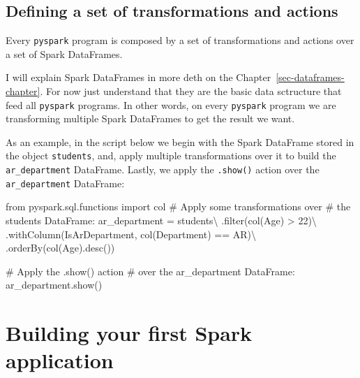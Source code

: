 \documentclass[
  11pt,
  letterpaper,
  DIV=11,
  numbers=noendperiod]{scrreprt}
\newenvironment{Shaded}{\begin{snugshade}}{\end{snugshade}}
\newcommand{\BuiltInTok}[1]{\textcolor[rgb]{0.00,0.23,0.31}{#1}}
\newcommand{\CommentTok}[1]{\textcolor[rgb]{0.37,0.37,0.37}{#1}}
\newcommand{\DecValTok}[1]{\textcolor[rgb]{0.68,0.00,0.00}{#1}}
\newcommand{\ImportTok}[1]{\textcolor[rgb]{0.00,0.46,0.62}{#1}}
\newcommand{\NormalTok}[1]{\textcolor[rgb]{0.00,0.23,0.31}{#1}}
\newcommand{\OperatorTok}[1]{\textcolor[rgb]{0.37,0.37,0.37}{#1}}
\newcommand{\StringTok}[1]{\textcolor[rgb]{0.13,0.47,0.30}{#1}}
\begin{document}
\subsection{Defining a set of transformations and
actions}\label{defining-a-set-of-transformations-and-actions}

Every \texttt{pyspark} program is composed by a set of transformations
and actions over a set of Spark DataFrames.

I will explain Spark DataFrames in more deth on the
Chapter~\ref{sec-dataframes-chapter}. For now just understand that they
are the basic data sctructure that feed all \texttt{pyspark} programs.
In other words, on every \texttt{pyspark} program we are transforming
multiple Spark DataFrames to get the result we want.

As an example, in the script below we begin with the Spark DataFrame
stored in the object \texttt{students}, and, apply multiple
transformations over it to build the \texttt{ar\_department} DataFrame.
Lastly, we apply the \texttt{.show()} action over the
\texttt{ar\_department} DataFrame:

\begin{Shaded}
\begin{Highlighting}[]
\ImportTok{from}\NormalTok{ pyspark.sql.functions }\ImportTok{import}\NormalTok{ col}
\CommentTok{\# Apply some transformations over}
\CommentTok{\# the \textasciigrave{}students\textasciigrave{} DataFrame:}
\NormalTok{ar\_department }\OperatorTok{=}\NormalTok{ students}\OperatorTok{\textbackslash{}}
\NormalTok{  .}\BuiltInTok{filter}\NormalTok{(col(}\StringTok{\textquotesingle{}Age\textquotesingle{}}\NormalTok{) }\OperatorTok{\textgreater{}} \DecValTok{22}\NormalTok{)}\OperatorTok{\textbackslash{}}
\NormalTok{  .withColumn(}\StringTok{\textquotesingle{}IsArDepartment\textquotesingle{}}\NormalTok{, col(}\StringTok{\textquotesingle{}Department\textquotesingle{}}\NormalTok{) }\OperatorTok{==} \StringTok{\textquotesingle{}AR\textquotesingle{}}\NormalTok{)}\OperatorTok{\textbackslash{}}
\NormalTok{  .orderBy(col(}\StringTok{\textquotesingle{}Age\textquotesingle{}}\NormalTok{).desc())}
  
  
\CommentTok{\# Apply the \textasciigrave{}.show()\textasciigrave{} action}
\CommentTok{\# over the \textasciigrave{}ar\_department\textasciigrave{} DataFrame:}
\NormalTok{ar\_department.show()}
\end{Highlighting}
\end{Shaded}

\section{Building your first Spark
application}\label{building-your-first-spark-application}
\end{document}
